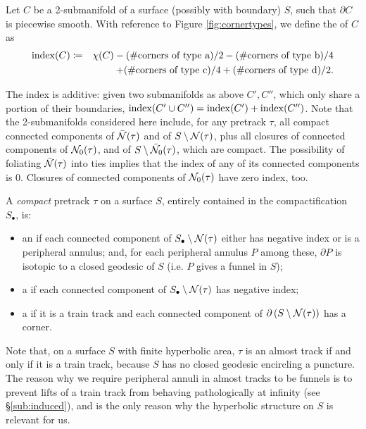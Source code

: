\begin{defin}
Let $C$ be a 2-submanifold of a surface (possibly with boundary) $S$, such that $\partial C$ is piecewise smooth. With reference to Figure \ref{fig:cornertypes}, we define the  of $C$ as
\begin{eqnarray*}
\mathrm{index}(C) & \coloneqq & \chi(C) - (\#\text{corners of type a})/2 - (\#\text{corners of type b})/4\\
 & & + (\#\text{corners of type c})/4 + (\#\text{corners of type d})/2.
\end{eqnarray*}
\end{defin}

The index is additive: given two submanifolds as above $C',C''$, which only share a portion of their boundaries, $\mathrm{index}(C'\cup C'')=\mathrm{index}(C')+\mathrm{index}(C'')$. Note that the 2-submanifolds considered here include, for any pretrack $\tau$, all compact connected components of $\bar{{\mathcal N}}(\tau)$ and of $S\setminus {\mathcal N}(\tau)$, plus all closures of connected components of ${\mathcal N}_0(\tau)$, and of $S\setminus\bar {{\mathcal N}}_0(\tau)$, which are compact. The possibility of foliating $\bar{{\mathcal N}}(\tau)$ into ties implies that the index of any of its connected components is $0$. Closures of connected components of ${\mathcal N}_0(\tau)$ have zero index, too.

\begin{defin}
A \emph{compact} pretrack $\tau$ on a surface $S$, entirely contained in the compactification $S_\bullet$, is:
\begin{itemize}
\item an  if each connected component of $S_\bullet\setminus{\mathcal N}(\tau)$ either has negative index or is a peripheral annulus; and, for each peripheral annulus $P$ among these, $\partial P$ is isotopic to a closed geodesic of $S$ (i.e. $P$ gives a funnel in $S$);
\item a  if each connected component of $S_\bullet\setminus{\mathcal N}(\tau)$ has negative index;
\item a  if it is a train track and each connected component of $\partial\left(S\setminus{\mathcal N}(\tau)\right)$ has a corner.
\end{itemize}
\end{defin}

Note that, on a surface $S$ with finite hyperbolic area, $\tau$ is an almost track if and only if it is a train track, because $S$ has no closed geodesic encircling a puncture. The reason why we require peripheral annuli in almost tracks to be funnels is to prevent lifts of a train track from behaving pathologically at infinity (see \S \ref{sub:induced}), and is the only reason why the hyperbolic structure on $S$ is relevant for us.

